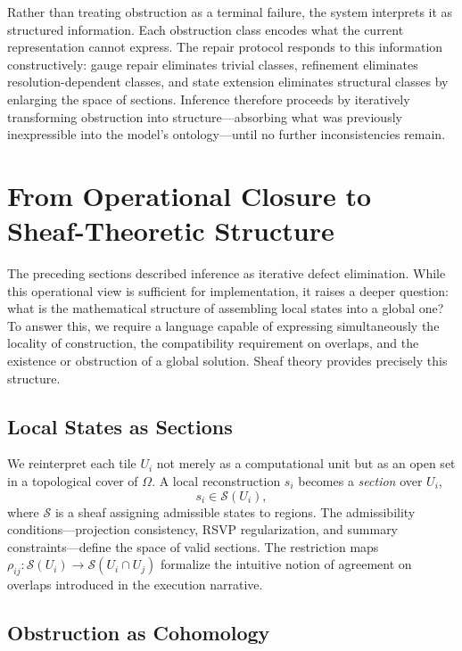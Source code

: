 \documentclass[12pt, oneside]{article}
\begin{document}
Rather than treating obstruction as a terminal failure, the system interprets it as structured information. Each obstruction class encodes what the current representation cannot express. The repair protocol responds to this information constructively: gauge repair eliminates trivial classes, refinement eliminates resolution-dependent classes, and state extension eliminates structural classes by enlarging the space of sections. Inference therefore proceeds by iteratively transforming obstruction into structure---absorbing what was previously inexpressible into the model's ontology---until no further inconsistencies remain.

\section{From Operational Closure to Sheaf-Theoretic Structure}

The preceding sections described inference as iterative defect elimination. While this operational view is sufficient for implementation, it raises a deeper question: what is the mathematical structure of assembling local states into a global one? To answer this, we require a language capable of expressing simultaneously the locality of construction, the compatibility requirement on overlaps, and the existence or obstruction of a global solution. Sheaf theory provides precisely this structure.

\subsection{Local States as Sections}

We reinterpret each tile $U_i$ not merely as a computational unit but as an open set in a topological cover of $\Omega$. A local reconstruction $s_i$ becomes a \emph{section} over $U_i$,
\[
s_i \in \mathcal{S}(U_i),
\]
where $\mathcal{S}$ is a sheaf assigning admissible states to regions. The admissibility conditions---projection consistency, RSVP regularization, and summary constraints---define the space of valid sections. The restriction maps $\rho_{ij} : \mathcal{S}(U_i) \to \mathcal{S}(U_i \cap U_j)$ formalize the intuitive notion of agreement on overlaps introduced in the execution narrative.

\subsection{Obstruction as Cohomology}
\end{document}
